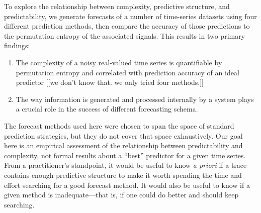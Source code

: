To explore the relationship between complexity, predictive structure,
and predictability, we generate forecasts of a number of time-series
datasets using four different prediction methods, then compare the
accuracy of those predictions to the permutation entropy of the
associated signals.  This results in two primary findings:
\begin{enumerate}
\item The complexity of a noisy real-valued time series is
  quantifiable by permutation entropy and correlated with prediction
  accuracy of an ideal predictor [[we don't know that.  we only tried
      four methods.]]
\item The way information is generated and processed internally by a
  system plays a crucial role in the success of different forecasting
  schema.
\end{enumerate}
The forecast methods used here were chosen to span the space of
standard prediction strategies, but they do not cover that space
exhaustively.  Our goal here is an empirical assessment of the
relationship between predictability and complexity, not formal results
about a ``best'' predictor for a given time series.  From a
practitioner's standpoint, it would be useful to know {\sl a priori}
if a trace contains enough predictive structure to make it worth
spending the time and effort searching for a good forecast method.  It
would also be useful to know if a given method is inadequate---that
is, if one could do better and should keep searching.


